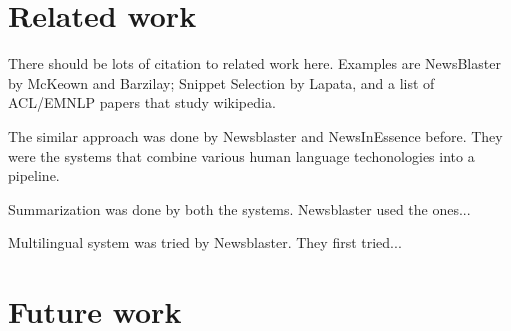 \documentclass[11pt]{article}
\newcommand{\war}[1]{{\sf\small #1}}
\begin{document}
%
%
%
%
%
%
%


\section{Related work}
\label{sec:related-work}

There should be lots of citation to related work here. Examples are NewsBlaster by McKeown and Barzilay; Snippet Selection by Lapata, and a list of ACL/EMNLP papers that study wikipedia.

The similar approach was done by Newsblaster and NewsInEssence before. They were the systems that combine various human language techonologies into a pipeline.

Summarization was done by both the systems. Newsblaster used the ones...

Multilingual system was tried by Newsblaster. They first tried...



\section{Future work}
\end{document}
